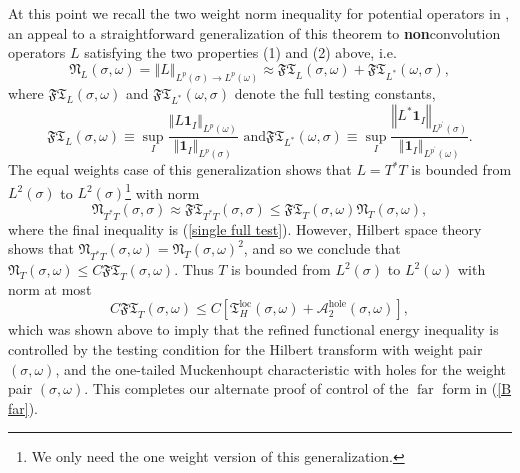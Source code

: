 \documentclass{amsart}%
\theoremstyle{plain}
\numberwithin{equation}{section}
\begin{document}
At this point we recall the two weight norm inequality for potential operators
in \cite[Theorem 1]{Saw3}, an appeal to a straightforward generalization of
this theorem to \textbf{non}convolution operators $L$ satisfying the two
properties (1) and (2) above, i.e.%
\[
\mathfrak{N}_{L}\left(  \sigma,\omega\right)  =\left\Vert L\right\Vert
_{L^{p}\left(  \sigma\right)  \rightarrow L^{p}\left(  \omega\right)  }%
\approx\mathfrak{FT}_{L}\left(  \sigma,\omega\right)  +\mathfrak{FT}_{L^{\ast
}}\left(  \omega,\sigma\right)  ,
\]
where $\mathfrak{FT}_{L}\left(  \sigma,\omega\right)  $ and $\mathfrak{FT}%
_{L^{\ast}}\left(  \omega,\sigma\right)  $ denote the full testing constants,%
\[
\mathfrak{FT}_{L}\left(  \sigma,\omega\right)  \equiv\sup_{I}\frac{\left\Vert
L\mathbf{1}_{I}\right\Vert _{L^{p}\left(  \omega\right)  }}{\left\Vert
\mathbf{1}_{I}\right\Vert _{L^{p}\left(  \sigma\right)  }}\text{ and
}\mathfrak{FT}_{L^{\ast}}\left(  \omega,\sigma\right)  \equiv\sup_{I}%
\frac{\left\Vert L^{\ast}\mathbf{1}_{I}\right\Vert _{L^{p^{\prime}}\left(
\sigma\right)  }}{\left\Vert \mathbf{1}_{I}\right\Vert _{L^{p^{\prime}}\left(
\omega\right)  }}.
\]
The equal weights case of this generalization shows that $L=T^{\ast}T$ is
bounded from $L^{2}\left(  \sigma\right)  $ to $L^{2}\left(  \sigma\right)
$\footnote{We only need the one weight version of this generalization.} with
norm%
\[
\mathfrak{N}_{T^{\ast}T}\left(  \sigma,\sigma\right)  \approx\mathfrak{FT}%
_{T^{\ast}T}\left(  \sigma,\sigma\right)  \leq\mathfrak{FT}_{T}\left(
\sigma,\omega\right)  \mathfrak{N}_{T}\left(  \sigma,\omega\right)  ,
\]
where the final inequality is (\ref{single full test}). However, Hilbert space
theory shows that $\mathfrak{N}_{T^{\ast}T}\left(  \sigma,\omega\right)
=\mathfrak{N}_{T}\left(  \sigma,\omega\right)  ^{2}$, and so we conclude that
$\mathfrak{N}_{T}\left(  \sigma,\omega\right)  \leq C\mathfrak{FT}_{T}\left(
\sigma,\omega\right)  $. Thus $T$ is bounded from $L^{2}\left(  \sigma\right)
$ to $L^{2}\left(  \omega\right)  $ with norm at most
\[
C\mathfrak{FT}_{T}\left(  \sigma,\omega\right)  \leq C\left[  \mathfrak{T}%
_{H}^{\operatorname{loc}}\left(  \sigma,\omega\right)  +\mathcal{A}%
_{2}^{\operatorname*{hole}}\left(  \sigma,\omega\right)  \right]  ,
\]
which was shown above to imply that the refined functional energy inequality
is controlled by the testing condition for the Hilbert transform with weight
pair $\left(  \sigma,\omega\right)  $, and the one-tailed Muckenhoupt
characteristic with holes for the weight pair $\left(  \sigma,\omega\right)
$. This completes our alternate proof of control of the $\operatorname*{far}$
form in (\ref{B far}).
\end{document}
